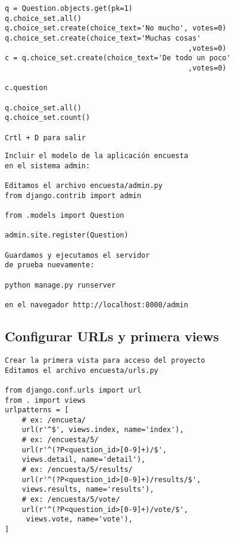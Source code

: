 \documentclass[xcolor=dvipsnames]{beamer}
\begin{document}
\begin{frame}[fragile]
\begin{verbatim}
q = Question.objects.get(pk=1)
q.choice_set.all()
q.choice_set.create(choice_text='No mucho', votes=0)
q.choice_set.create(choice_text='Muchas cosas' 
                                           ,votes=0)
c = q.choice_set.create(choice_text='De todo un poco'
                                           ,votes=0)

c.question

q.choice_set.all()
q.choice_set.count()

Crtl + D para salir

\end{verbatim}
\end{frame}

\begin{frame}[fragile]
\begin{verbatim}
Incluir el modelo de la aplicación encuesta 
en el sistema admin:

Editamos el archivo encuesta/admin.py
from django.contrib import admin

from .models import Question

admin.site.register(Question)

Guardamos y ejecutamos el servidor 
de prueba nuevamente:

python manage.py runserver

en el navegador http://localhost:8000/admin

\end{verbatim}
\end{frame}

\subsection{Configurar URLs y primera views}
\begin{frame}[fragile]
\begin{verbatim}
Crear la primera vista para acceso del proyecto 
Editamos el archivo encuesta/urls.py

from django.conf.urls import url
from . import views
urlpatterns = [
    # ex: /encueta/
    url(r'^$', views.index, name='index'),
    # ex: /encuesta/5/
    url(r'^(?P<question_id>[0-9]+)/$', 
    views.detail, name='detail'),
    # ex: /encuesta/5/results/
    url(r'^(?P<question_id>[0-9]+)/results/$',
    views.results, name='results'),
    # ex: /encuesta/5/vote/
    url(r'^(?P<question_id>[0-9]+)/vote/$',
     views.vote, name='vote'),
]
\end{verbatim}
\end{frame}
\end{document}
